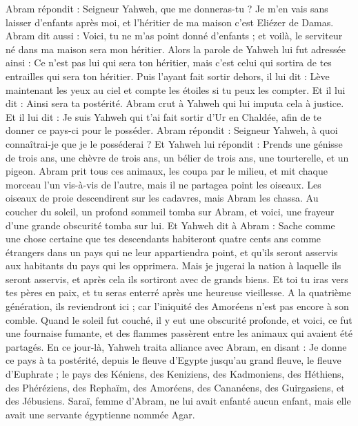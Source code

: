 \begin{multicols}{2}
Abram répondit : Seigneur Yahweh, que me donneras-tu ? Je m'en vais sans laisser d'enfants après moi, et l’héritier de ma maison c'est Eliézer de Damas.
Abram dit aussi : Voici, tu ne m'as point donné d'enfants ; et voilà, le serviteur né dans ma maison sera mon héritier.
Alors la parole de Yahweh lui fut adressée ainsi : Ce n’est pas lui qui sera ton héritier, mais c’est celui qui sortira de tes entrailles qui sera ton héritier.
Puis l'ayant fait sortir dehors, il lui dit : Lève maintenant les yeux au ciel et compte les étoiles si tu peux les compter. Et il lui dit : Ainsi sera ta postérité.
Abram crut à Yahweh qui lui imputa cela à justice.
Et il lui dit : Je suis Yahweh qui t'ai fait sortir d'Ur en Chaldée, afin de te donner ce pays-ci pour le posséder.
Abram répondit : Seigneur Yahweh, à quoi connaîtrai-je que je le posséderai ?
Et Yahweh lui répondit : Prends une génisse de trois ans,  une chèvre de trois ans, un bélier de trois ans, une tourterelle, et un pigeon.
Abram prit tous ces animaux, les coupa par le milieu, et mit chaque morceau l’un vis-à-vis de l’autre, mais il ne partagea point les oiseaux.
Les oiseaux de proie descendirent sur les cadavres, mais Abram les chassa.
Au coucher du soleil, un profond sommeil tomba sur Abram, et voici, une frayeur d'une grande obscurité tomba sur lui.
Et Yahweh dit à Abram : Sache comme une chose certaine que tes descendants habiteront quatre cents ans comme étrangers dans un pays qui ne leur appartiendra point, et qu’ils seront asservis aux habitants du pays qui les opprimera.
Mais je jugerai la nation à laquelle ils seront asservis, et après cela ils sortiront avec de grands biens.
Et toi tu iras vers tes pères en paix, et tu seras enterré après une heureuse vieillesse.
A la quatrième génération, ils reviendront ici ; car l'iniquité des Amoréens n'est pas encore à son comble.
Quand le soleil fut couché, il y eut une obscurité profonde, et voici, ce fut une fournaise fumante, et des flammes passèrent entre les animaux qui avaient été partagés.
En ce jour-là, Yahweh traita alliance avec Abram, en disant : Je donne ce pays à ta postérité, depuis le fleuve d'Egypte jusqu'au grand fleuve, le fleuve d'Euphrate ;
le pays des Kéniens, des Keniziens, des Kadmoniens,
des Héthiens, des Phéréziens, des Rephaïm,
des Amoréens, des Cananéens, des Guirgasiens, et des Jébusiens.
\VerseOne{}Saraï, femme d'Abram, ne lui avait enfanté aucun enfant, mais elle avait une servante égyptienne nommée Agar.

\end{multicols}
